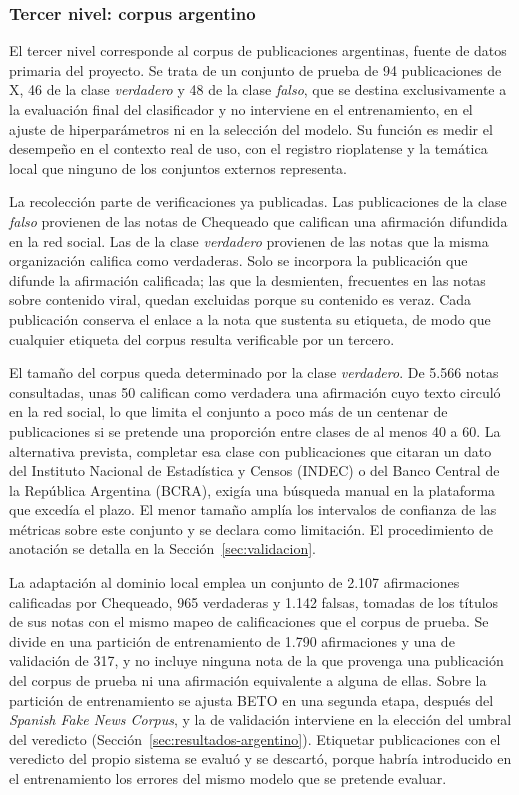\subsubsection{Tercer nivel: corpus argentino}

El tercer nivel corresponde al corpus de publicaciones argentinas, fuente de datos primaria del proyecto. Se trata de un conjunto de prueba de 94 publicaciones de X, 46 de la clase \textit{verdadero} y 48 de la clase \textit{falso}, que se destina exclusivamente a la evaluación final del clasificador y no interviene en el entrenamiento, en el ajuste de hiperparámetros ni en la selección del modelo. Su función es medir el desempeño en el contexto real de uso, con el registro rioplatense y la temática local que ninguno de los conjuntos externos representa.

La recolección parte de verificaciones ya publicadas. Las publicaciones de la clase \textit{falso} provienen de las notas de Chequeado \parencite{Chequeado2026} que califican una afirmación difundida en la red social. Las de la clase \textit{verdadero} provienen de las notas que la misma organización califica como verdaderas. Solo se incorpora la publicación que difunde la afirmación calificada; las que la desmienten, frecuentes en las notas sobre contenido viral, quedan excluidas porque su contenido es veraz. Cada publicación conserva el enlace a la nota que sustenta su etiqueta, de modo que cualquier etiqueta del corpus resulta verificable por un tercero.

El tamaño del corpus queda determinado por la clase \textit{verdadero}. De 5.566 notas consultadas, unas 50 califican como verdadera una afirmación cuyo texto circuló en la red social, lo que limita el conjunto a poco más de un centenar de publicaciones si se pretende una proporción entre clases de al menos 40 a 60. La alternativa prevista, completar esa clase con publicaciones que citaran un dato del Instituto Nacional de Estadística y Censos (INDEC) o del Banco Central de la República Argentina (BCRA), exigía una búsqueda manual en la plataforma que excedía el plazo. El menor tamaño amplía los intervalos de confianza de las métricas sobre este conjunto y se declara como limitación. El procedimiento de anotación se detalla en la Sección~\ref{sec:validacion}.

La adaptación al dominio local emplea un conjunto de 2.107 afirmaciones calificadas por Chequeado, 965 verdaderas y 1.142 falsas, tomadas de los títulos de sus notas con el mismo mapeo de calificaciones que el corpus de prueba. Se divide en una partición de entrenamiento de 1.790 afirmaciones y una de validación de 317, y no incluye ninguna nota de la que provenga una publicación del corpus de prueba ni una afirmación equivalente a alguna de ellas. Sobre la partición de entrenamiento se ajusta BETO en una segunda etapa, después del \textit{Spanish Fake News Corpus}, y la de validación interviene en la elección del umbral del veredicto (Sección~\ref{sec:resultados-argentino}). Etiquetar publicaciones con el veredicto del propio sistema se evaluó y se descartó, porque habría introducido en el entrenamiento los errores del mismo modelo que se pretende evaluar.

